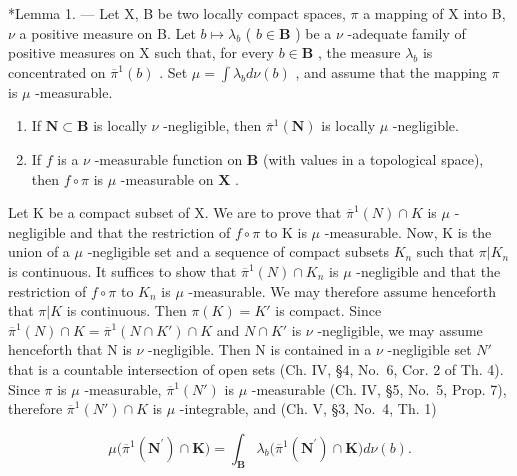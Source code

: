 \appendixheading

*Lemma 1. --- Let X, B be two locally compact spaces, \(\pi\) a mapping of X into B, \(\nu\) a positive measure on B. Let \(b \mapsto \lambda_b\) ( \(b \in \mathbf{B}\) ) be a \(\nu\) -adequate family of positive measures on X such that, for every \(b \in \mathbf{B}\) , the measure \(\lambda_b\) is concentrated on \(\overline{\pi}^1(b)\) . Set \(\mu = \int \lambda_b d\nu(b)\) , and assume that the mapping \(\pi\) is \(\mu\) -measurable.

\begin{enumerate}
\def\labelenumi{\alph{enumi})}
\item
  If \(\mathbf{N} \subset \mathbf{B}\) is locally \(\nu\) -negligible, then \(\overline{\pi}^1(\mathbf{N})\) is locally \(\mu\) -negligible.
\item
  If \(f\) is a \(\nu\) -measurable function on \(\mathbf{B}\) (with values in a topological space), then \(f \circ \pi\) is \(\mu\) -measurable on \(\mathbf{X}\) .
\end{enumerate}

Let K be a compact subset of X. We are to prove that \(\overline{\pi}^{1}(N) \cap K\) is \(\mu\) -negligible and that the restriction of \(f \circ \pi\) to K is \(\mu\) -measurable. Now, K is the union of a \(\mu\) -negligible set and a sequence of compact subsets \(K_{n}\) such that \(\pi|K_{n}\) is continuous. It suffices to show that \(\overline{\pi}^{1}(N) \cap K_{n}\) is \(\mu\) -negligible and that the restriction of \(f \circ \pi\) to \(K_{n}\) is \(\mu\) -measurable. We may therefore assume henceforth that \(\pi|K\) is continuous. Then \(\pi(K) = K'\) is compact. Since \(\overline{\pi}^{1}(N) \cap K = \overline{\pi}^{1}(N \cap K') \cap K\) and \(N \cap K'\) is \(\nu\) -negligible, we may assume henceforth that N is \(\nu\) -negligible. Then N is contained in a \(\nu\) -negligible set \(N'\) that is a countable intersection of open sets (Ch. IV, §4, No.~6, Cor. 2 of Th. 4). Since \(\pi\) is \(\mu\) -measurable, \(\overline{\pi}^{1}(N')\) is \(\mu\) -measurable (Ch. IV, §5, No.~5, Prop. 7), therefore \(\overline{\pi}^{1}(N') \cap K\) is \(\mu\) -integrable, and (Ch. V, §3, No.~4, Th. 1)

\[
\mu \big (\overline {{{{\pi}}}} ^ {1} (\mathbf {N} ^ {\prime}) \cap \mathbf {K} \big) = \int_ {\mathbf {B}} \lambda_ {b} \big (\overline {{{{\pi}}}} ^ {1} (\mathbf {N} ^ {\prime}) \cap \mathbf {K} \big) d \nu (b).
\]

